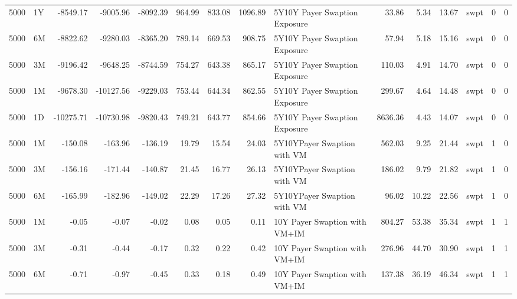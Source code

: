 \begin{tabular}{rlrrrrrrlrrrlrr}
5000 & 1Y &  -8549.17 &  -9005.96 & -8092.39 &  964.99 &  833.08 & 1096.89 & 5Y10Y Payer Swaption Exposure &   33.86 &     5.34 &    13.67 & swpt &   0 &   0 \\
5000 & 6M &  -8822.62 &  -9280.03 & -8365.20 &  789.14 &  669.53 &  908.75 & 5Y10Y Payer Swaption Exposure &   57.94 &     5.18 &    15.16 & swpt &   0 &   0 \\
5000 & 3M &  -9196.42 &  -9648.25 & -8744.59 &  754.27 &  643.38 &  865.17 & 5Y10Y Payer Swaption Exposure &  110.03 &     4.91 &    14.70 & swpt &   0 &   0 \\
5000 & 1M &  -9678.30 & -10127.56 & -9229.03 &  753.44 &  644.34 &  862.55 & 5Y10Y Payer Swaption Exposure &  299.67 &     4.64 &    14.48 & swpt &   0 &   0 \\
5000 & 1D & -10275.71 & -10730.98 & -9820.43 &  749.21 &  643.77 &  854.66 & 5Y10Y Payer Swaption Exposure & 8636.36 &     4.43 &    14.07 & swpt &   0 &   0 \\
5000 & 1M &   -150.08 &   -163.96 &  -136.19 &   19.79 &   15.54 &   24.03 &   5Y10YPayer Swaption with VM &  562.03 &     9.25 &    21.44 & swpt &   1 &   0 \\
5000 & 3M &   -156.16 &   -171.44 &  -140.87 &   21.45 &   16.77 &   26.13 &   5Y10YPayer Swaption with VM &  186.02 &     9.79 &    21.82 & swpt &   1 &   0 \\
5000 & 6M &   -165.99 &   -182.96 &  -149.02 &   22.29 &   17.26 &   27.32 &   5Y10YPayer Swaption with VM &   96.02 &    10.22 &    22.56 & swpt &   1 &   0 \\
5000 & 1M &     -0.05 &     -0.07 &    -0.02 &    0.08 &    0.05 &    0.11 & 10Y Payer Swaption with VM+IM &  804.27 &    53.38 &    35.34 & swpt &   1 &   1 \\
5000 & 3M &     -0.31 &     -0.44 &    -0.17 &    0.32 &    0.22 &    0.42 & 10Y Payer Swaption with VM+IM &  276.96 &    44.70 &    30.90 & swpt &   1 &   1 \\
5000 & 6M &     -0.71 &     -0.97 &    -0.45 &    0.33 &    0.18 &    0.49 & 10Y Payer Swaption with VM+IM &  137.38 &    36.19 &    46.34 & swpt &   1 &   1 \\
\bottomrule
\end{tabular}
